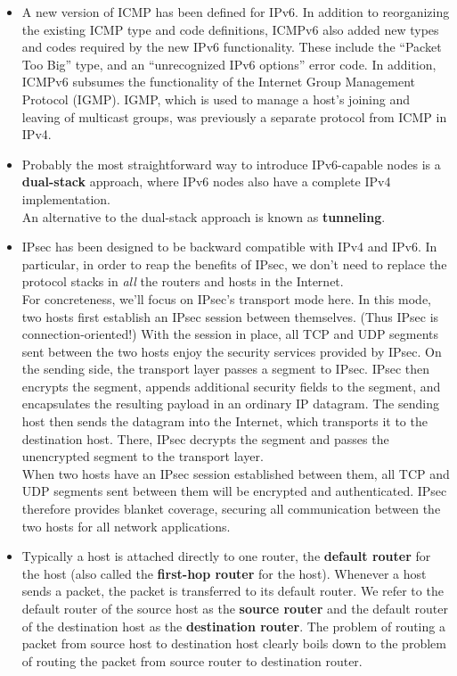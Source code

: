 \begin{itemize}
\item
A new version of ICMP has been defined for IPv6. In addition to reorganizing the existing ICMP type and code definitions, ICMPv6 also added new types and codes required by the new IPv6 functionality. These include the ``Packet Too Big'' type, and an ``unrecognized IPv6 options'' error code. In addition, ICMPv6 subsumes the functionality of the Internet Group Management Protocol (IGMP). IGMP, which is used to manage a host's joining and leaving of multicast groups, was previously a separate protocol from ICMP in IPv4.

\item
Probably the most straightforward way to introduce IPv6-capable nodes is a \textbf{dual-stack} approach, where IPv6 nodes also have a complete IPv4 implementation.\\
An alternative to the dual-stack approach is known as \textbf{tunneling}.

\item
IPsec has been designed to be backward compatible with IPv4 and IPv6. In particular, in order to reap the benefits of IPsec, we don't need to replace the protocol stacks in \textit{all} the routers and hosts in the Internet.\\
For concreteness, we'll focus on IPsec's transport mode here. In this mode, two hosts first establish an IPsec session between themselves. (Thus IPsec is connection-oriented!) With the session in place, all TCP and UDP segments sent between the two hosts enjoy the security services provided by IPsec. On the sending side, the transport layer passes a segment to IPsec. IPsec then encrypts the segment, appends additional security fields to the segment, and encapsulates the resulting payload in an ordinary IP datagram. The sending host then sends the datagram into the Internet, which transports it to the destination host. There, IPsec decrypts the segment and passes the unencrypted segment to the transport layer.\\
When two hosts have an IPsec session established between them, all TCP and UDP segments sent between them will be encrypted and authenticated. IPsec therefore provides blanket coverage, securing all communication between the two hosts for all network applications.

\item
Typically a host is attached directly to one router, the \textbf{default router} for the host (also called the \textbf{first-hop router} for the host). Whenever a host sends a packet, the packet is transferred to its default router. We refer to the default router of the source host as the \textbf{source router} and the default router of the destination host as the \textbf{destination router}. The problem of routing a packet from source host to destination host clearly boils down to the problem of routing the packet from source router to destination router.


\end{itemize}
